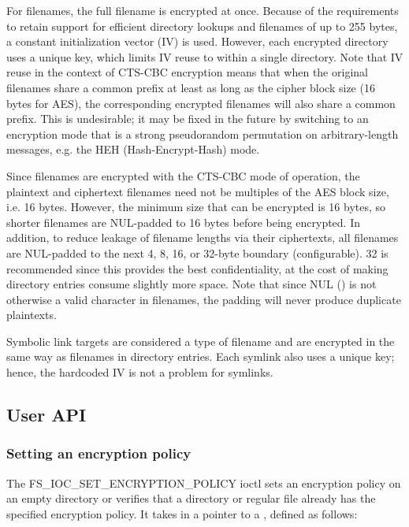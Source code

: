 \documentclass[a4paper,8pt,english]{sphinxmanual}
\begin{document}
For filenames, the full filename is encrypted at once.  Because of the
requirements to retain support for efficient directory lookups and
filenames of up to 255 bytes, a constant initialization vector (IV) is
used.  However, each encrypted directory uses a unique key, which
limits IV reuse to within a single directory.  Note that IV reuse in
the context of CTS-CBC encryption means that when the original
filenames share a common prefix at least as long as the cipher block
size (16 bytes for AES), the corresponding encrypted filenames will
also share a common prefix.  This is undesirable; it may be fixed in
the future by switching to an encryption mode that is a strong
pseudorandom permutation on arbitrary-length messages, e.g. the HEH
(Hash-Encrypt-Hash) mode.

Since filenames are encrypted with the CTS-CBC mode of operation, the
plaintext and ciphertext filenames need not be multiples of the AES
block size, i.e. 16 bytes.  However, the minimum size that can be
encrypted is 16 bytes, so shorter filenames are NUL-padded to 16 bytes
before being encrypted.  In addition, to reduce leakage of filename
lengths via their ciphertexts, all filenames are NUL-padded to the
next 4, 8, 16, or 32-byte boundary (configurable).  32 is recommended
since this provides the best confidentiality, at the cost of making
directory entries consume slightly more space.  Note that since NUL
() is not otherwise a valid character in filenames, the padding
will never produce duplicate plaintexts.

Symbolic link targets are considered a type of filename and are
encrypted in the same way as filenames in directory entries.  Each
symlink also uses a unique key; hence, the hardcoded IV is not a
problem for symlinks.


\subsection{User API}
\label{filesystems/fscrypt:user-api}

\subsubsection{Setting an encryption policy}
\label{filesystems/fscrypt:setting-an-encryption-policy}
The FS\_IOC\_SET\_ENCRYPTION\_POLICY ioctl sets an encryption policy on an
empty directory or verifies that a directory or regular file already
has the specified encryption policy.  It takes in a pointer to a
, defined as follows:
\end{document}
